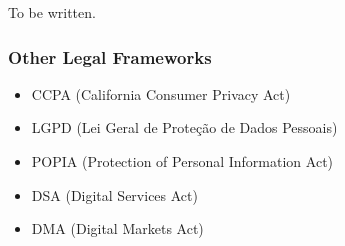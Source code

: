To be written.

\subsubsection{Other Legal Frameworks}

\begin{itemize}
 \item CCPA (California Consumer Privacy Act)
 \item LGPD (Lei Geral de Proteção de Dados Pessoais)
 \item POPIA (Protection of Personal Information Act)
 \item DSA (Digital Services Act)
 \item DMA (Digital Markets Act)
\end{itemize}



